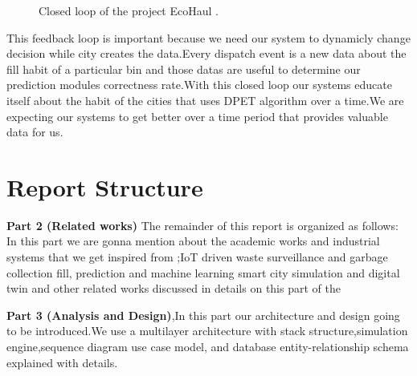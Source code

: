 \documentclass[12pt,a4paper]{report}
\begin{document}
\begin{figure}[H]
\centering
{}
\caption{Closed loop of the project EcoHaul .}
\label{fig:feedback_loop}
\end{figure}



\indent This feedback loop is important because we need our system to dynamicly change decision while city creates the data.Every dispatch event is a new data about the fill habit of a particular bin and those datas are useful to determine our prediction modules correctness rate.With this closed loop our systems educate itself about the habit of the cities that uses DPET algorithm over a time.We are expecting our systems to get better over a time period that provides valuable data for us.

\section{Report Structure}

\indent \textbf {Part 2 (Related works)} The remainder of this report is organized as follows:
In this part we are gonna mention about the academic works and industrial systems that we get inspired from ;IoT driven waste surveillance and garbage collection fill, prediction  and machine learning smart city simulation and digital twin and other related works discussed in details on this part of the

\indent \textbf{Part 3 (Analysis and Design)},In this part our architecture and design going to be introduced.We use a multilayer architecture with stack structure,simulation engine,sequence diagram use case model, and database entity-relationship schema explained with details.
\end{document}
